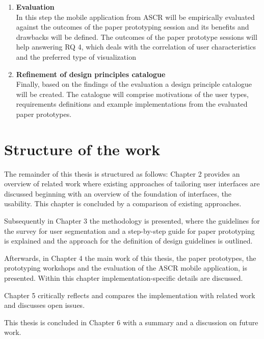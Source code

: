 \begin{enumerate}
	\item \textbf{Evaluation} \\
	In this step the mobile application from ASCR will be empirically evaluated against the outcomes of the paper prototyping session and its benefits and drawbacks will be defined. The outcomes of the paper prototype sessions will help answering RQ 4, which deals with the correlation of user characteristics and the preferred type of visualization 
	
	\item \textbf{Refinement of design principles catalogue} \\
	Finally, based on the findings of the evaluation a design principle catalogue will be created. The catalogue will comprise motivations of the user types, requirements definitions and example implementations from the evaluated paper prototypes.
	
\end{enumerate}


\section{Structure of the work} 
The remainder of this thesis is structured as follows:  Chapter 2 provides an overview of related work where existing approaches of tailoring user interfaces are discussed beginning with an overview of the foundation of interfaces, the usability. This chapter is concluded by a comparison of existing approaches.

Subsequently in Chapter 3 the methodology is presented, where the guidelines for the survey for user segmentation and a step-by-step guide for paper prototyping is explained and the approach for the definition of design guidelines is outlined.

Afterwards, in Chapter 4 the main work of this thesis, the paper prototypes, the prototyping workshops and the evaluation of the ASCR mobile application, is presented. Within this chapter implementation-specific details are discussed.

Chapter 5 critically reflects and compares the implementation with related work and discusses open issues.

This thesis is concluded in Chapter 6 with a summary and a discussion on future work.

